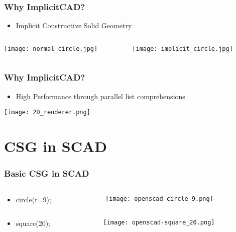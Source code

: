 \documentclass{beamer}
\begin{document}
\begin{frame}
  \frametitle{Why ImplicitCAD?}
\begin{itemize}
\item Implicit Constructive Solid Geometry
\end{itemize}
\begin{columns}
  \begin{column}{0.5\textwidth}
    \texttt{[image: normal\_circle.jpg]}
  \end{column}
  \begin{column}{0.5\textwidth}
    \texttt{[image: implicit\_circle.jpg]}
  \end{column}
\end{columns}
\end{frame}

\begin{frame}
\frametitle{Why ImplicitCAD?}
\begin{itemize}
\item High Performance through parallel list comprehensions
\end{itemize}
\texttt{[image: 2D\_renderer.png]}
\end{frame}

\section{CSG in SCAD}

\begin{frame}
\frametitle{Basic CSG in SCAD}
\begin{columns}
  \begin{column}{0.5\textwidth}
    \begin{itemize}
    \item circle(r=9);
    \end{itemize}
  \end{column}
  \begin{column}{0.5\textwidth}
    \texttt{[image: openscad-circle\_9.png]}
  \end{column}
\end{columns}
\begin{columns}
  \begin{column}{0.5\textwidth}
    \begin{itemize}
    \item square(20);
    \end{itemize}
  \end{column}
  \begin{column}{0.5\textwidth}
    \texttt{[image: openscad-square\_20.png]}
  \end{column}
\end{columns}
\end{frame}
\end{document}
